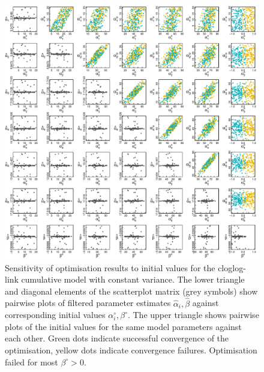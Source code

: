 \begin{figure}[p]
  \centering
  \includegraphics[width=\textwidth]{../figures/figS3_initial_value_sensitivity_cloglog.pdf}
  \caption{Sensitivity of optimisation results to initial values for the cloglog-link cumulative model with constant variance. The lower triangle and diagonal elements of the scatterplot matrix (grey symbols) show pairwise plots of filtered parameter estimates $\hat{\alpha}_i, \hat{\beta}$ against corresponding initial values $\alpha^{\circ}_i, \beta^{\circ}$. The upper triangle shows pairwise plots of the initial values for the same model parameters against each other. Green dots indicate successful convergence of the optimisation, yellow dots indicate convergence failures. Optimisation failed for most $\beta^{\circ}>0$.}
  \label{fig:figS3}
\end{figure} 